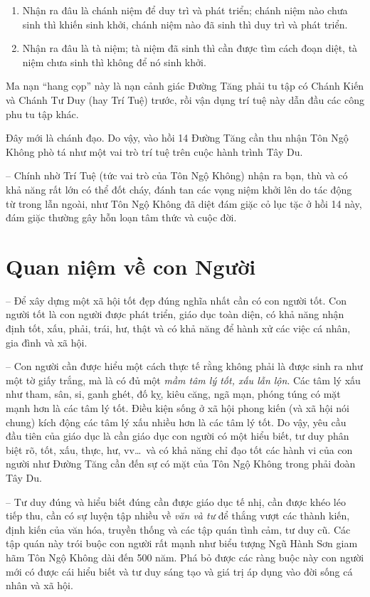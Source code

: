 \begin{enumerate}[label=\itshape\arabic*\upshape/]
    \item Nhận ra đâu là chánh niệm để duy trì và phát triển; chánh niệm nào chưa sinh thì khiến sinh khởi, chánh niệm nào đã sinh thì duy trì và phát triển.

    \item Nhận ra đâu là tà niệm; tà niệm đã sinh thì cần được tìm cách đoạn diệt, tà niệm chưa sinh thì không để nó sinh khởi.
\end{enumerate}

Ma nạn ``hang cọp'' này là nạn cảnh giác Đường Tăng phải tu tập có Chánh Kiến và Chánh Tư Duy (hay Trí Tuệ) trước, rồi vận dụng trí tuệ này dẫn đầu các công phu tu tập khác.

Đây mới là chánh đạo. Do vậy, vào hồi 14 Đường Tăng cần thu nhận Tôn Ngộ Không phò tá như một vai trò trí tuệ trên cuộc hành trình Tây Du.

-- Chính nhờ Trí Tuệ (tức vai trò của Tôn Ngộ Không) nhận ra bạn, thù và có khả năng rất lớn có thể đốt cháy, đánh tan các vọng niệm khởi lên do tác động từ trong lẫn ngoài, như Tôn Ngộ Không đã diệt đám giặc cỏ lục tặc ở hồi 14 này, đám giặc thường gây hỗn loạn tâm thức và cuộc đời.

\section{Quan niệm về con Người} %
\label{sec:13_con_nguoi}

-- Để xây dựng một xã hội tốt đẹp đúng nghĩa nhất cần có con người tốt. Con người tốt là con người được phát triển, giáo dục toàn diện, có khả năng nhận định tốt, xấu, phải, trái, hư, thật và có khả năng để hành xử các việc cá nhân, gia đình và xã hội.

-- Con người cần được hiểu một cách thực tế rằng không phải là được sinh ra như một tờ giấy trắng, mà là có đủ một \emph{mầm tâm lý tốt, xấu lẫn lộn}. Các tâm lý xấu như tham, sân, si, ganh ghét, đố kỵ, kiêu căng, ngã mạn, phóng túng có mặt mạnh hơn là các tâm lý tốt. Điều kiện sống ở xã hội phong kiến (và xã hội nói chung) kích động các tâm lý xấu nhiều hơn là các tâm lý tốt. Do vậy, yêu cầu đầu tiên của giáo dục là cần giáo dục con người có một hiểu biết, tư duy phân biệt rõ, tốt, xấu, thực, hư, vv\ldots ~và có khả năng chỉ đạo tốt các hành vi của con người như Đường Tăng cần đến sự có mặt của Tôn Ngộ Không trong phải đoàn Tây Du.

-- Tư duy đúng và hiểu biết đúng cần được giáo dục tế nhị, cần được khéo léo tiếp thu, cần có sự luyện tập nhiều về \emph{văn và tư} để thắng vượt các thành kiến, định kiến của văn hóa, truyền thống và các tập quán tình cảm, tư duy cũ. Các tập quán này trói buộc con người rất mạnh như biểu tượng Ngũ Hành Sơn giam hãm Tôn Ngộ Không dài đến 500 năm. Phá bỏ được các ràng buộc này con người mới có được cái hiểu biết và tư duy sáng tạo và giá trị áp dụng vào đời sống cá nhân và xã hội.

